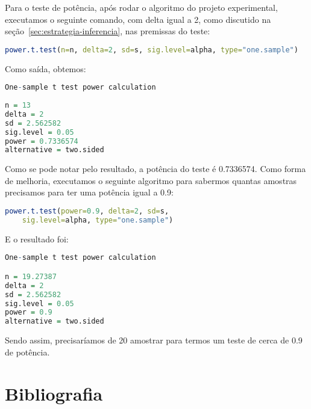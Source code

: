 \documentclass[12pt, a4paper]{article}
\begin{document}
\par Para o teste de potência, após rodar o algoritmo do projeto experimental, executamos o seguinte comando, com delta igual a 2, como discutido na seção~\ref{sec:estrategia-inferencia}, nas premissas do teste:

\begin{lstlisting}[language=R]
power.t.test(n=n, delta=2, sd=s, sig.level=alpha, type="one.sample")
\end{lstlisting}

Como saída, obtemos:

\begin{lstlisting}[language=R]
One-sample t test power calculation 
     
n = 13
delta = 2
sd = 2.562582
sig.level = 0.05
power = 0.7336574
alternative = two.sided
\end{lstlisting}

\par Como se pode notar pelo resultado, a potência do teste é 0.7336574. Como forma de melhoria, executamos o seguinte algoritmo para sabermos quantas amostras precisamos para ter uma potência igual a 0.9:

\begin{lstlisting}[language=R]
power.t.test(power=0.9, delta=2, sd=s,
	sig.level=alpha, type="one.sample")
\end{lstlisting}

E o resultado foi:

\begin{lstlisting}[language=R]
One-sample t test power calculation 

n = 19.27387
delta = 2
sd = 2.562582
sig.level = 0.05
power = 0.9
alternative = two.sided
\end{lstlisting}

\par Sendo assim, precisaríamos de 20 amostrar para termos um teste de cerca de 0.9 de potência.

\section{Bibliografia}
		
\end{document}
